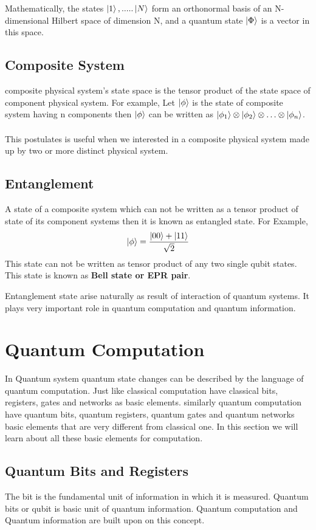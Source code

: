\documentclass[11 pt]{article}
\theoremstyle{definition}
\theoremstyle{remark}
\newcommand{\tens}[1]{
  \mathbin{\mathop{\otimes}\limits_{#1}}}
\begin{document}
Mathematically, the states $\ket{1}, ..... \ket{N}$ form an orthonormal basis of an N-dimensional Hilbert space of dimension N, and a
quantum state $\ket{\Phi}$ is a vector in this space.

\subsection{Composite System}
composite physical system's state space is the tensor product of the state space of component physical system. For example, Let $\ket{\phi}$ is the state of composite system having n components then $\ket{\phi}$ can be written as $\ket{\phi_1} \tens{} \ket{\phi_2} \tens{} \hdots \tens{} \ket{\phi_n}$.

This postulates is useful when we interested in a composite physical system made up by two or more distinct physical system.

\subsection{Entanglement}
A state of a composite system which can not be written as a tensor product of state of its component systems then it is known as entangled state. For Example,
$$\ket{\phi} = \dfrac{\ket{00} + \ket{11}}{\sqrt{2}}$$
This state can not be written as tensor product of any two single qubit states. This state is known as \textbf{Bell state or EPR pair}.

Entanglement state arise naturally as result of interaction of quantum systems. It plays very important role in quantum computation and quantum information.


\section{Quantum Computation}
In Quantum system quantum state changes can be described by the language of quantum computation. Just like classical computation have classical bits, registers, gates and networks as basic elements. similarly quantum computation have quantum bits, quantum registers, quantum gates and quantum networks basic elements that are very different from classical one. In this section we will learn about all these basic elements for computation.


\subsection{Quantum Bits and Registers}
The bit is the fundamental unit of information in which it is measured. Quantum bits or qubit is basic unit of quantum information. Quantum computation and Quantum information are built upon on this concept.
\end{document}
